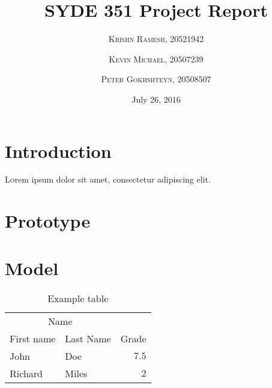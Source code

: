 \documentclass[twoside,twocolumn]{article}
\title{SYDE 351 Project Report} %
\author{%
\textsc{Krishn Ramesh, 20521942} \\[1ex]
\and
\textsc{Kevin Michael, 20507239} \\[1ex]
\and
\textsc{Peter Gokhshteyn, 20508507} \\[1ex]
}
\date{July 26, 2016} %
\begin{document}
\maketitle


\section{Introduction}

\lettrine[nindent=0em,lines=3]{L} orem ipsum dolor sit amet, consectetur adipiscing elit.
\blindtext %


\section{Prototype}

\blindtext %

\section{Model}

\begin{table}
\caption{Example table}
\centering
\begin{tabular}{llr}
\toprule
\multicolumn{2}{c}{Name} \\
\cmidrule(r){1-2}
First name & Last Name & Grade \\
\midrule
John & Doe & $7.5$ \\
Richard & Miles & $2$ \\
\bottomrule
\end{tabular}
\end{table}
\end{document}
